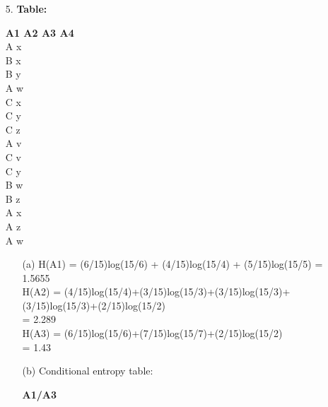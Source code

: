 \documentclass[12pt]{article}
\begin{document}
\begin{enumerate}
\item[5.] \textbf{Table:} \\
\begin{center}
\textbf{A1 \qquad A2 \qquad A3 \qquad A4} \\

A  \qquad \quad x \qquad \quad {} \quad {} \\
B  \qquad \quad x \qquad \quad {} \quad {} \\
B  \qquad \quad y \qquad \quad {} \quad {} \\
A  \qquad \quad w \qquad \quad {} \quad {} \\
C  \qquad \quad x \qquad \quad {} \quad {} \\
C  \qquad \quad y \qquad \quad {} \quad {} \\
C  \qquad \quad z \qquad \quad {} \quad {} \\
A  \qquad \quad v \qquad \quad {} \quad {} \\
C  \qquad \quad v \qquad \quad {} \quad {} \\
C  \qquad \quad y \qquad \quad {} \quad {} \\
B  \qquad \quad w \qquad \quad {} \quad {} \\
B  \qquad \quad z \qquad \quad {} \quad {} \\
A  \qquad \quad x \qquad \quad {} \quad {} \\
A  \qquad \quad z \qquad \quad {} \quad {} \\
A  \qquad \quad w \qquad \quad {} \quad {} \\
\end{center}
\begin{itemize}
	\item[(a)] H(A1) = (6/15)log(15/6) + (4/15)log(15/4) + (5/15)log(15/5) = 1.5655 \\
	
	H(A2) = (4/15)log(15/4)+(3/15)log(15/3)+(3/15)log(15/3)+ (3/15)log(15/3)+(2/15)log(15/2) \\
	= 2.289 \\
	
	H(A3) = (6/15)log(15/6)+(7/15)log(15/7)+(2/15)log(15/2) \\
	= 1.43 \\
	\newpage
	
	\item[(b)] Conditional entropy table: \\
\begin{center}	
	\textbf{A1/A3  \qquad {} \qquad {}} \\
	

\end{center}
\end{itemize}
\end{enumerate}
\end{document}
